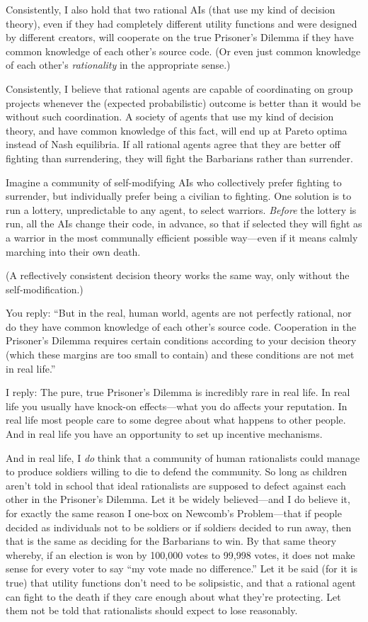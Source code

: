 {
 Consistently, I also hold that two rational AIs (that use my kind
of decision theory), even if they had completely different utility
functions and were designed by different creators, will cooperate on
the true Prisoner's Dilemma if they have common
knowledge of each other's source code. (Or even just
common knowledge of each other's \textit{rationality}
in the appropriate sense.)}

{
 Consistently, I believe that rational agents are capable of
coordinating on group projects whenever the (expected probabilistic)
outcome is better than it would be without such coordination. A society
of agents that use my kind of decision theory, and have common
knowledge of this fact, will end up at Pareto optima instead of Nash
equilibria. If all rational agents agree that they are better off
fighting than surrendering, they will fight the Barbarians rather than
surrender.}

{
 Imagine a community of self-modifying AIs who collectively prefer
fighting to surrender, but individually prefer being a civilian to
fighting. One solution is to run a lottery, unpredictable to any agent,
to select warriors. \textit{Before} the lottery is run, all the AIs
change their code, in advance, so that if selected they will fight as a
warrior in the most communally efficient possible way---even if it
means calmly marching into their own death.}

{
 (A reflectively consistent decision theory works the same way,
only without the self-modification.)}

{
 You reply: ``But in the real, human world, agents
are not perfectly rational, nor do they have common knowledge of each
other's source code. Cooperation in the
Prisoner's Dilemma requires certain conditions
according to your decision theory (which these margins are too small to
contain) and these conditions are not met in real
life.''}

{
 I reply: The pure, true Prisoner's Dilemma is
incredibly rare in real life. In real life you usually have knock-on
effects---what you do affects your reputation. In real life most people
care to some degree about what happens to other people. And in real
life you have an opportunity to set up incentive mechanisms.}

{
 And in real life, I \textit{do} think that a community of human
rationalists could manage to produce soldiers willing to die to defend
the community. So long as children aren't told in
school that ideal rationalists are supposed to defect against each
other in the Prisoner's Dilemma. Let it be widely
believed---and I do believe it, for exactly the same reason I one-box
on Newcomb's Problem---that if people decided as
individuals not to be soldiers or if soldiers decided to run away, then
that is the same as deciding for the Barbarians to win. By that same
theory whereby, if an election is won by 100,000 votes to 99,998 votes,
it does not make sense for every voter to say ``my
vote made no difference.'' Let it be said (for it is
true) that utility functions don't need to be
solipsistic, and that a rational agent can fight to the death if they
care enough about what they're protecting. Let them not
be told that rationalists should expect to lose reasonably.}

